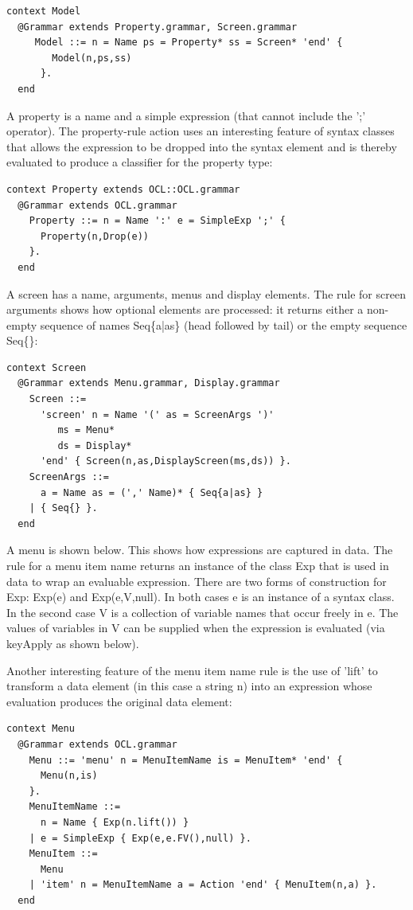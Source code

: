 \begin{lstlisting}
context Model
  @Grammar extends Property.grammar, Screen.grammar
     Model ::= n = Name ps = Property* ss = Screen* 'end' {
        Model(n,ps,ss)
      }.
  end
\end{lstlisting}A property is a name and a simple expression (that cannot include
the ';' operator). The property-rule action uses an interesting feature
of syntax classes that allows the expression to be dropped into the
syntax element and is thereby evaluated to produce a classifier for
the property type:

\begin{lstlisting}
context Property extends OCL::OCL.grammar
  @Grammar extends OCL.grammar
    Property ::= n = Name ':' e = SimpleExp ';' {
      Property(n,Drop(e))
    }.
  end
\end{lstlisting}A screen has a name, arguments, menus and display elements. The rule
for screen arguments shows how optional elements are processed: it
returns either a non-empty sequence of names Seq\{a|as\} (head followed
by tail) or the empty sequence Seq\{\}:

\begin{lstlisting}
context Screen
  @Grammar extends Menu.grammar, Display.grammar
    Screen ::= 
      'screen' n = Name '(' as = ScreenArgs ')' 
         ms = Menu* 
         ds = Display* 
      'end' { Screen(n,as,DisplayScreen(ms,ds)) }.
    ScreenArgs ::=
      a = Name as = (',' Name)* { Seq{a|as} }
    | { Seq{} }.
  end
\end{lstlisting}A menu is shown below. This shows how expressions are captured in
data. The rule for a menu item name returns an instance of the class
Exp that is used in data to wrap an evaluable expression. There are
two forms of construction for Exp: Exp(e) and Exp(e,V,null). In both
cases e is an instance of a syntax class. In the second case V is
a collection of variable names that occur freely in e. The values
of variables in V can be supplied when the expression is evaluated
(via keyApply as shown below).

Another interesting feature of the menu item name rule is the use
of 'lift' to transform a data element (in this case a string n) into
an expression whose evaluation produces the original data element:

\begin{lstlisting}
context Menu
  @Grammar extends OCL.grammar
    Menu ::= 'menu' n = MenuItemName is = MenuItem* 'end' {
      Menu(n,is)
    }.
    MenuItemName ::= 
      n = Name { Exp(n.lift()) }
    | e = SimpleExp { Exp(e,e.FV(),null) }.
    MenuItem ::=
      Menu
    | 'item' n = MenuItemName a = Action 'end' { MenuItem(n,a) }.
  end
\end{lstlisting}\newpage{}

